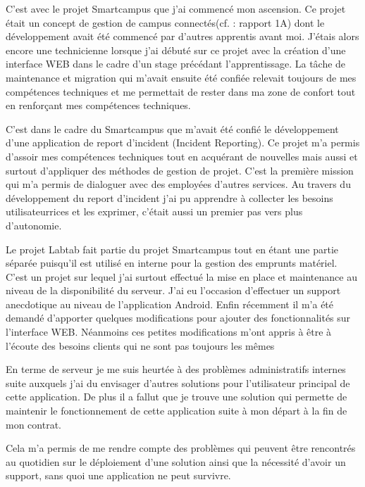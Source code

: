\documentclass[french,12pt,a4paper,titlepage,openright,openbib]{report}
\begin{document}
C'est avec le projet Smartcampus que j'ai commencé mon ascension. Ce projet était un concept de gestion de campus connectés(cf. : rapport 1A) dont le développement avait été commencé par d'autres apprentis avant moi. J'étais alors encore une technicienne lorsque j'ai débuté sur ce projet avec la création d'une interface WEB dans le cadre d'un stage précédant l'apprentissage.
La tâche de maintenance et migration qui m'avait ensuite été confiée relevait toujours de mes compétences techniques et me permettait de rester dans ma zone de confort tout en renforçant mes compétences techniques.

C'est dans le cadre du Smartcampus que m'avait été confié le développement d'une application de report d'incident (Incident Reporting). Ce projet m'a permis d'assoir mes compétences techniques tout en acquérant de nouvelles mais aussi et surtout d'appliquer des méthodes de gestion de projet. C'est la première mission qui m'a permis de dialoguer avec des employé\textperiodcentered e\textperiodcentered s d'autres services. Au travers du développement du report d'incident j'ai pu apprendre à collecter les besoins utilisateur\textperiodcentered rice\textperiodcentered s et les exprimer, c'était aussi un premier pas vers plus d'autonomie.

Le projet Labtab fait partie du projet Smartcampus tout en étant une partie séparée puisqu'il est utilisé en interne pour la gestion des emprunts matériel. C'est un projet sur lequel j'ai surtout effectué la mise en place et maintenance au niveau de la disponibilité du serveur.
J'ai eu l'occasion d'effectuer un support anecdotique au niveau de l'application Android. Enfin récemment il m'a été demandé d'apporter quelques modifications pour ajouter des fonctionnalités sur l'interface WEB. Néanmoins ces petites modifications m'ont appris à être à l'écoute des besoins clients qui ne sont pas toujours les mêmes 

En terme de serveur je me suis heurtée à des problèmes administratifs internes suite auxquels j'ai du envisager d'autres solutions pour l'utilisateur principal de cette application. De plus il a fallut que je trouve une solution qui permette de maintenir le fonctionnement de cette application suite à mon départ à la fin de mon contrat. 

Cela m'a permis de me rendre compte des problèmes qui peuvent être rencontrés au quotidien sur le déploiement d'une solution ainsi que la nécessité d'avoir un support, sans quoi une application ne peut survivre.
\end{document}
